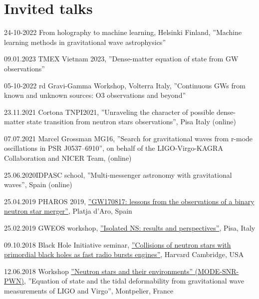 \documentclass[]{friggeri-cv} %
\begin{document}
%  
\section{Invited talks}
\begin{entrylistoc}

\entrys
{24-10-2022}
{From holography to machine learning, Helsinki Finland, ''Machine learning methods in gravitational wave astrophysics''}

\entrys
{09.01.2023}
{TMEX Vietnam 2023, ''Dense-matter equation of state from GW observations''} 

\entrys
{05-10-2022}
{rd Gravi-Gamma Workshop, Volterra Italy, ''Continuous GWs from known and unknown sources: O3 observations and beyond''}

\entrys 
{23.11.2021}
{Cortona TNPI2021, ''Unraveling the character of possible dense-matter state transition from neutron stars observations'', Pisa Italy (online)}

\entrys
{07.07.2021}{
Marcel Grossman MG16, ''Search for gravitational waves from r-mode oscillations in PSR J0537--6910'', on behalf of the LIGO-Virgo-KAGRA Collaboration and NICER Team, (online)}

\entrys
{25.06.2020}{IDPASC school, ''Multi-messenger astronomy with gravitational waves'', Spain (online)}

\entrys 
{25.04.2019} 
{{PHAROS 2019}, \href{https://indico.ice.csic.es/event/12/page/12-final-program}{''GW170817: lessons from the observations of a binary neutron star merger''}, {Platja d'Aro, Spain}}  

\entrys 
{25.02.2019} 
{{GWEOS workshop}, \href{https://agenda.infn.it/event/17643/timetable/\#20190225}{''Isolated NS: results and perspectives''}, {Pisa, Italy}} 

\entrys 
{09.10.2018} 
{{Black Hole Initiative seminar}, \href{https://arxiv.org/abs/1704.05931}{''Collisions of neutron stars with primordial black holes as fast radio bursts engines''}, {Harvard Cambridge, USA}} 

\entrys
{12.06.2018}
{{Workshop \href{https://mode2018.sciencesconf.org/program}{''Neutron stars and their environments'' (MODE-SNR-PWN)}}, {''Equation of state and the tidal deformability from gravitational wave measurements of LIGO and Virgo'', Montpelier, France}}



\end{entrylistoc}
\end{document}
